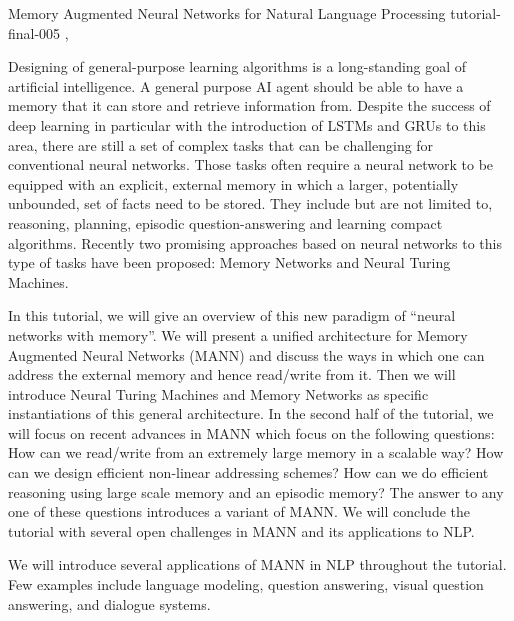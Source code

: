 \begin{tutorial}
  {Memory Augmented Neural Networks for Natural Language Processing}
  {tutorial-final-005}
  {\daydateyear, \tutorialafternoontime}
  {\TutLocE}

Designing of general-purpose learning algorithms is a long-standing goal of artificial intelligence. A general purpose AI agent should be able to have a memory that it can store and retrieve information from. Despite the success of deep learning in particular with the introduction of LSTMs and GRUs to this area, there are still a set of complex tasks that can be challenging for conventional neural networks. Those tasks often require a neural network to be equipped with an explicit, external memory in which a larger, potentially unbounded, set of facts need to be stored. They include but are not limited to, reasoning, planning, episodic question-answering and learning compact algorithms. Recently two promising approaches based on neural networks to this type of tasks have been proposed: Memory Networks and Neural Turing Machines.

In this tutorial, we will give an overview of this new paradigm of “neural networks with memory”. We will present a unified architecture for Memory Augmented Neural Networks (MANN) and discuss the ways in which one can address the external memory and hence read/write from it. Then we will introduce Neural Turing Machines and Memory Networks as specific instantiations of this general architecture. In the second half of the tutorial, we will focus on recent advances in MANN which focus on the following questions: How can we read/write from an extremely large memory in a scalable way? How can we design efficient non-linear addressing schemes? How can we do efficient reasoning using large scale memory and an episodic memory? The answer to any one of these questions introduces a variant of MANN. We will conclude the tutorial with several open challenges in MANN and its applications to NLP.

We will introduce several applications of MANN in NLP throughout the tutorial. Few examples include language modeling, question answering, visual question answering, and dialogue systems.
\end{tutorial}
